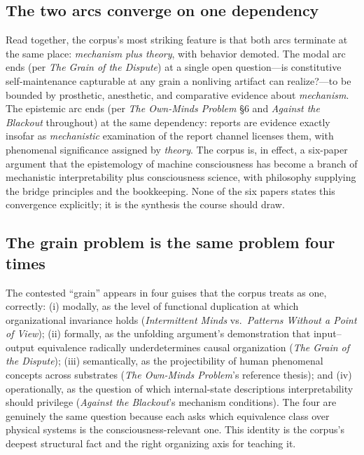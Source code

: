 \documentclass[11pt]{article}
\newcommand{\IM}{\emph{Intermittent Minds}}
\newcommand{\PP}{\emph{Patterns Without a Point of View}}
\newcommand{\GD}{\emph{The Grain of the Dispute}}
\newcommand{\OM}{\emph{The Own-Minds Problem}}
\newcommand{\AB}{\emph{Against the Blackout}}
\begin{document}
\subsection{The two arcs converge on one dependency}
Read together, the corpus's most striking feature is that both arcs terminate at the same place: \emph{mechanism plus theory}, with behavior demoted. The modal arc ends (per \GD{}) at a single open question---is constitutive self-maintenance capturable at any grain a nonliving artifact can realize?---to be bounded by prosthetic, anesthetic, and comparative evidence about \emph{mechanism}. The epistemic arc ends (per \OM{} \S 6 and \AB{} throughout) at the same dependency: reports are evidence exactly insofar as \emph{mechanistic} examination of the report channel licenses them, with phenomenal significance assigned by \emph{theory}. The corpus is, in effect, a six-paper argument that the epistemology of machine consciousness has become a branch of mechanistic interpretability plus consciousness science, with philosophy supplying the bridge principles and the bookkeeping. None of the six papers states this convergence explicitly; it is the synthesis the course should draw.

\subsection{The grain problem is the same problem four times}
The contested ``grain'' appears in four guises that the corpus treats as one, correctly: (i) modally, as the level of functional duplication at which organizational invariance holds (\IM{} vs.\ \PP{}); (ii) formally, as the unfolding argument's demonstration that input--output equivalence radically underdetermines causal organization (\GD{}); (iii) semantically, as the projectibility of human phenomenal concepts across substrates (\OM{}'s reference thesis); and (iv) operationally, as the question of which internal-state descriptions interpretability should privilege (\AB{}'s mechanism conditions). The four are genuinely the same question because each asks which equivalence class over physical systems is the consciousness-relevant one. This identity is the corpus's deepest structural fact and the right organizing axis for teaching it.
\end{document}
